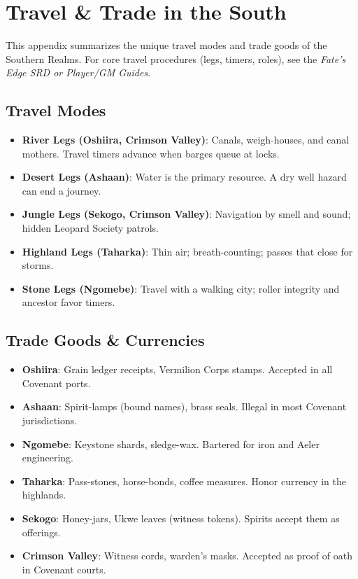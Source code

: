 \documentclass[12pt,oneside]{book}
\begin{document}
\newpage

\newpage

\appendix
\chapter{Travel \& Trade in the South}

This appendix summarizes the unique travel modes and trade goods of the Southern Realms. For core travel procedures (legs, timers, roles), see the \textit{Fate's Edge SRD or Player/GM Guides}.

\section*{Travel Modes}
\begin{itemize}
  \item \textbf{River Legs (Oshiira, Crimson Valley)}: Canals, weigh-houses, and canal mothers. Travel timers advance when barges queue at locks.
  \item \textbf{Desert Legs (Ashaan)}: Water is the primary resource. A dry well hazard can end a journey.
  \item \textbf{Jungle Legs (Sekogo, Crimson Valley)}: Navigation by smell and sound; hidden Leopard Society patrols.
  \item \textbf{Highland Legs (Taharka)}: Thin air; breath-counting; passes that close for storms.
  \item \textbf{Stone Legs (Ngomebe)}: Travel with a walking city; roller integrity and ancestor favor timers.
\end{itemize}

\section*{Trade Goods \& Currencies}
\begin{itemize}
  \item \textbf{Oshiira}: Grain ledger receipts, Vermilion Corps stamps. Accepted in all Covenant ports.
  \item \textbf{Ashaan}: Spirit-lamps (bound names), brass seals. Illegal in most Covenant jurisdictions.
  \item \textbf{Ngomebe}: Keystone shards, sledge-wax. Bartered for iron and Aeler engineering.
  \item \textbf{Taharka}: Pass-stones, horse-bonds, coffee measures. Honor currency in the highlands.
  \item \textbf{Sekogo}: Honey-jars, Ukwe leaves (witness tokens). Spirits accept them as offerings.
  \item \textbf{Crimson Valley}: Witness cords, warden's masks. Accepted as proof of oath in Covenant courts.
\end{itemize}
\end{document}
